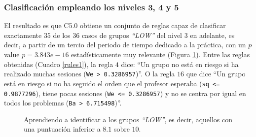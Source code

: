 \subsubsection{Clasificación empleando los niveles 3, 4 y 5}

El resultado es que C5.0 obtiene un conjunto de reglas capaz de clasificar exactamente $35$ de los $36$ casos de grupos \emph{``LOW''} del nivel $3$ en adelante, es decir, a partir de un tercio del periodo de tiempo dedicado a la práctica, con un $p$ value $p = 3.843e-16$ estadísticamente muy relevante (Figura \ref{fig:cm1}). Entre las reglas obtenidas (Cuadro \ref{rules1}), la regla $4$ dice: ``Un grupo no está en riesgo si ha realizado muchas sesiones (\texttt{We > 0.3286957})''. O la regla $16$ que dice ``Un grupo está en riesgo si no ha seguido el orden que el profesor esperaba (\texttt{sq <= 0.9877296}), tiene pocas sesiones (\texttt{We <= 0.3286957}) y no se centra por igual en todos los problemas (\texttt{Ba > 6.715498})''. %

\begin{figure}[H]
\centering
{}
\caption{Aprendiendo a identificar a los grupos \emph{``LOW''}, es decir, aquellos con una puntuación inferior a $8.1$ sobre $10$.}
\label{fig:cm1}
\end{figure}

